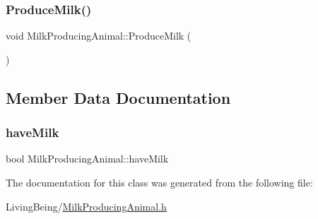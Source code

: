 \subsubsection{\texorpdfstring{ProduceMilk()}{ProduceMilk()}}
{\footnotesize\ttfamily void Milk\+Producing\+Animal\+::\+Produce\+Milk (\begin{DoxyParamCaption}{ }\end{DoxyParamCaption})}



\subsection{Member Data Documentation}
\mbox{\label{classMilkProducingAnimal_ad31582ea9ea4eedd26753c1d9a7bbf46}} 
\subsubsection{\texorpdfstring{haveMilk}{haveMilk}}
{\footnotesize\ttfamily bool Milk\+Producing\+Animal\+::have\+Milk\hspace{0.3cm}{\ttfamily [protected]}}



The documentation for this class was generated from the following file\+:\begin{DoxyCompactItemize}
\item 
Living\+Being/\mbox{\hyperlink{MilkProducingAnimal_8h}{Milk\+Producing\+Animal.\+h}}\end{DoxyCompactItemize}
